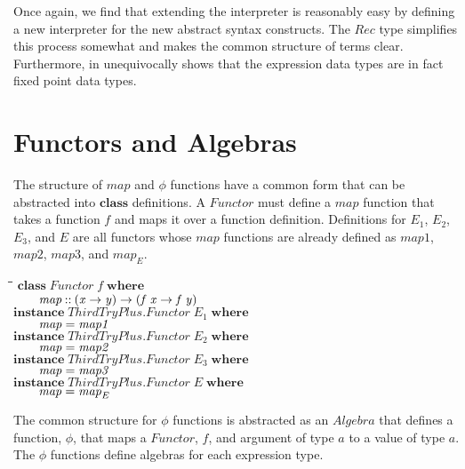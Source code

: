 \documentclass[10pt]{article}
\newlength{\lwidth}\setlength{\lwidth}{4.5cm}
\newlength{\cwidth}\setlength{\cwidth}{8mm} %
\newcommand{\Conid}[1]{\mathit{#1}}
\newcommand{\Varid}[1]{\mathit{#1}}
\begin{document}
Once again, we find that extending the interpreter is reasonably easy
by defining a new interpreter for the new abstract syntax constructs.
The \ensuremath{\Conid{Rec}} type simplifies this process somewhat and makes the common
structure of terms clear.  Furthermore, in unequivocally shows that
the expression data types are in fact fixed point data types.

\section{Functors and Algebras}

The structure of \ensuremath{\Varid{map}} and \ensuremath{\Varid{\phi}} functions have a common form that can
be abstracted into \ensuremath{\mathbf{class}} definitions.  A \ensuremath{\Conid{Functor}} must define a
\ensuremath{\Varid{map}} function that takes a function \ensuremath{\Varid{f}} and maps it over a function
definition.  Definitions for \ensuremath{\Varid{E}_1}, \ensuremath{\Varid{E}_2}, \ensuremath{\Varid{E}_3}, and \ensuremath{\Conid{E}} are all
functors whose \ensuremath{\Varid{map}} functions are already defined as \ensuremath{\Varid{map1}}, \ensuremath{\Varid{map2}},
\ensuremath{\Varid{map3}}, and \ensuremath{\Varid{map}_E}.

\begin{tabbing}
\qquad\=\hspace{\lwidth}\=\hspace{\cwidth}\=\+\kill
${\mathbf{class}\;\Conid{Functor}\;\Varid{f}\;\mathbf{where}}$\\
${\hskip2.00em\relax\Varid{map}\mathbin{::}(\Varid{x}\to \Varid{y})\to (\Varid{f}\;\Varid{x}\to \Varid{f}\;\Varid{y})}$\\
${}$\\
${\mathbf{instance}\;\Conid{\Conid{ThirdTryPlus}.Functor}\;\Varid{E}_1\;\mathbf{where}}$\\
${\hskip2.00em\relax\Varid{map}\mathrel{=}\Varid{map1}}$\\
${}$\\
${\mathbf{instance}\;\Conid{\Conid{ThirdTryPlus}.Functor}\;\Varid{E}_2\;\mathbf{where}}$\\
${\hskip2.00em\relax\Varid{map}\mathrel{=}\Varid{map2}}$\\
${}$\\
${\mathbf{instance}\;\Conid{\Conid{ThirdTryPlus}.Functor}\;\Varid{E}_3\;\mathbf{where}}$\\
${\hskip2.00em\relax\Varid{map}\mathrel{=}\Varid{map3}}$\\
${}$\\
${\mathbf{instance}\;\Conid{\Conid{ThirdTryPlus}.Functor}\;\Conid{E}\;\mathbf{where}}$\\
${\hskip2.00em\relax\Varid{map}\mathrel{=}\Varid{map}_E}$
\end{tabbing}
The common structure for \ensuremath{\Varid{\phi}} functions is abstracted as an \ensuremath{\Conid{Algebra}}
that defines a function, \ensuremath{\Varid{\phi}}, that maps a \ensuremath{\Conid{Functor}}, \ensuremath{\Varid{f}}, and
argument of type \ensuremath{\Varid{a}} to a value of type \ensuremath{\Varid{a}}.  The \ensuremath{\Varid{\phi}} functions
define algebras for each expression type.
\end{document}
